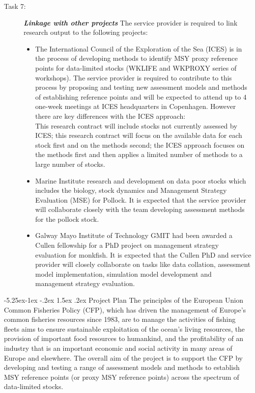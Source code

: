 \documentclass[a4paper, 10pt]{article}
\makeatletter
\renewcommand{\section}{\@startsection{section}{1}{\z@}%
  {-5.25ex\@plus -1ex \@minus -.2ex}%
  {1.5ex \@plus .2ex}%
  {\normalfont\bfseries}}
\makeatother
\begin{document}
\begin{description}
 \item[Task 7:] \textbf{\textit{Linkage with other projects}} The service provider is required to link research output to the following projects: 
 \begin{itemize}
  \item The International Council of the Exploration of the Sea (ICES) is in the process of developing methods to identify MSY proxy reference points for data-limited stocks (WKLIFE and WKPROXY series of workshops). The service provider is required to contribute to this process by proposing and testing new assessment models and methods of establishing reference points and will be expected to attend up to 4 one-week meetings at ICES headquarters in Copenhagen. However there are key differences with the ICES approach: \\
This research contract will include stocks not currently assessed by ICES;
this research contract will focus on the available data for each stock first and on the methods second; the ICES approach focuses on the methods first and then applies a limited number of methods to a large number of stocks.
\item Marine Institute research and development on data poor stocks which includes the biology, stock dynamics and Management Strategy Evaluation (MSE) for Pollock.  It is expected that the service provider will collaborate closely with the team developing assessment methods for the pollock stock.
\item Galway Mayo Institute of Technology GMIT had been awarded a Cullen fellowship for a PhD project on management strategy evaluation for monkfish. It is expected that the Cullen PhD and service provider will closely collaborate on tasks like data collation, assessment model implementation, simulation model development and management strategy evaluation. 
\end{itemize}
\end{description}



\section{Project Plan}
The principles of the European Union Common Fisheries Policy (CFP), which has driven the management of Europe's common fisheries resources since 1983, are to manage the activities of fishing fleets aims to ensure sustainable exploitation of the ocean's living resources, the provision of important food resources to humankind, and the profitability of an industry that is an important economic and social activity in many areas of Europe and elsewhere. The overall aim of the project is to support the CFP by developing and testing a range of assessment models and methods to establish MSY reference points (or proxy MSY reference points) across the spectrum of data-limited stocks. 
\end{document}
